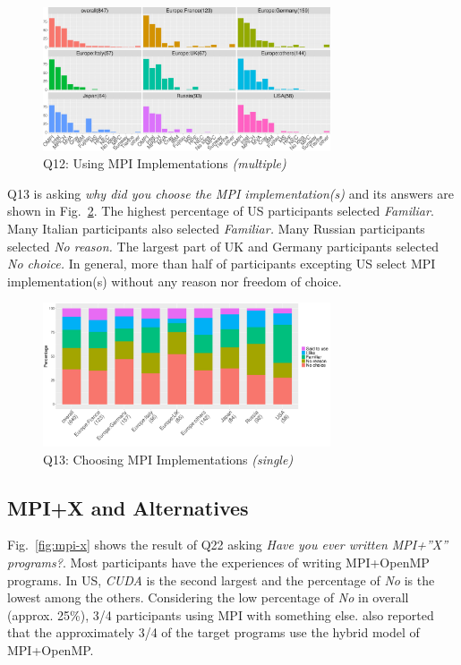 \documentclass[preprint,5p,times]{elsarticle}
\def\myquote#1{{\it #1}}
\begin{document}
  \begin{figure}[htb]
    \begin{center}
      \includegraphics[width=8.5cm]{R-scripts/Q12.pdf}
      \caption{Q12: Using MPI Implementations {\it(multiple)}}
      \label{fig:using-implementations}
    \end{center}
  \end{figure}

  Q13 is asking \myquote{why did you choose the MPI implementation(s)} and its
  answers are shown in Fig.~\ref{fig:choosing-implementation}. The highest
  percentage of US participants selected \myquote{Familiar}. Many Italian
  participants also selected \myquote{Familiar.} Many Russian
  participants selected \myquote{No reason.} The largest part of UK and Germany
  participants selected \myquote{No choice.}
  In general, more than half of participants excepting US select MPI
  implementation(s) without any reason nor freedom of choice.

  \begin{figure}[htb]
    \begin{center}
      \includegraphics[width=8.5cm]{R-scripts/Q13.pdf}
      \caption{Q13: Choosing MPI Implementations {\it(single)}}
      \label{fig:choosing-implementation}
    \end{center}
  \end{figure}

\subsection{MPI+X and Alternatives}

Fig.~\ref{fig:mpi-x} shows the result of Q22 asking \myquote{Have you ever
written MPI+''X'' programs?}. Most participants have the experiences of
writing MPI+OpenMP programs. In US, \myquote{CUDA} is the second
largest and the percentage of \myquote{No} is the lowest among the
others. Considering the low percentage of \myquote{No} in overall (approx.
25\%), 3/4 participants using MPI with something else.
\cite{10.1145/3295500.3356176} also reported that the approximately 3/4 of
the target programs use the hybrid model of MPI+OpenMP.
\end{document}
